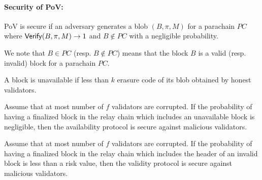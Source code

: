\paragraph{Security of PoV:} PoV is secure if an adversary generates a blob $(B,\pi,M)$ for a parachain $PC$ where  $\mathsf{Verify}(B,\pi,M) \rightarrow 1$ and $B \notin PC$ with a negligible probability.


We note that $B\in PC$ (resp. $B \notin PC$) means that the block $B$ is a valid (resp. invalid) block for a parachain $PC$.


\begin{definition}\label{def:unavail}
A block is unavailable if less than $k$ erasure code of its blob obtained by honest validators.
\end{definition}


\begin{definition}
Assume that at most number of $f$ validators are corrupted. If the probability of having a finalized block in the relay chain which includes an unavailable block is negligible, then the availability protocol is secure against malicious validators.
\end{definition}

\begin{definition}
Assume that  at most number of $f$ validators are corrupted. If the probability of having a finalized block in the relay chain which includes the header of an invalid block is less than a risk value, then the validity protocol is secure against malicious validators.
\end{definition}







